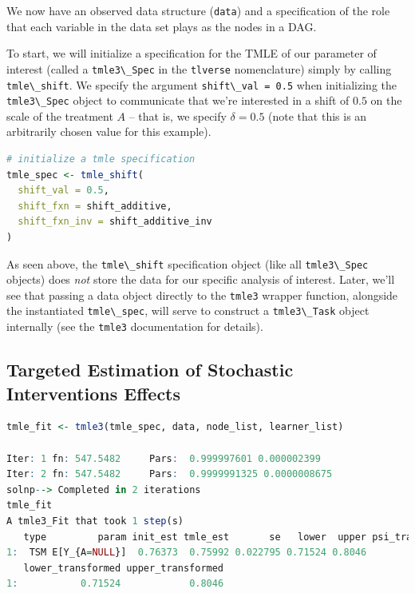 \documentclass[12pt, krantz2,]{krantz}
\newcommand{\passthrough}[1]{#1}
\theoremstyle{definition}
\theoremstyle{definition}
\theoremstyle{definition}
\newcommand{\1}{\mathbbm{1}}
\begin{document}
We now have an observed data structure (\passthrough{\lstinline!data!}) and a specification of the role
that each variable in the data set plays as the nodes in a DAG.

To start, we will initialize a specification for the TMLE of our parameter of
interest (called a \passthrough{\lstinline!tmle3\_Spec!} in the \passthrough{\lstinline!tlverse!} nomenclature) simply by calling
\passthrough{\lstinline!tmle\_shift!}. We specify the argument \passthrough{\lstinline!shift\_val = 0.5!} when initializing the
\passthrough{\lstinline!tmle3\_Spec!} object to communicate that we're interested in a shift of \(0.5\) on
the scale of the treatment \(A\) -- that is, we specify \(\delta = 0.5\) (note that
this is an arbitrarily chosen value for this example).

\begin{lstlisting}[language=R]
# initialize a tmle specification
tmle_spec <- tmle_shift(
  shift_val = 0.5,
  shift_fxn = shift_additive,
  shift_fxn_inv = shift_additive_inv
)
\end{lstlisting}

As seen above, the \passthrough{\lstinline!tmle\_shift!} specification object (like all \passthrough{\lstinline!tmle3\_Spec!}
objects) does \emph{not} store the data for our specific analysis of interest. Later,
we'll see that passing a data object directly to the \passthrough{\lstinline!tmle3!} wrapper function,
alongside the instantiated \passthrough{\lstinline!tmle\_spec!}, will serve to construct a \passthrough{\lstinline!tmle3\_Task!}
object internally (see the \passthrough{\lstinline!tmle3!} documentation for details).

\hypertarget{targeted-estimation-of-stochastic-interventions-effects}{%
\subsection{Targeted Estimation of Stochastic Interventions Effects}\label{targeted-estimation-of-stochastic-interventions-effects}}

\begin{lstlisting}[language=R]
tmle_fit <- tmle3(tmle_spec, data, node_list, learner_list)

Iter: 1 fn: 547.5482     Pars:  0.999997601 0.000002399
Iter: 2 fn: 547.5482     Pars:  0.9999991325 0.0000008675
solnp--> Completed in 2 iterations
tmle_fit
A tmle3_Fit that took 1 step(s)
   type         param init_est tmle_est       se   lower  upper psi_transformed
1:  TSM E[Y_{A=NULL}]  0.76373  0.75992 0.022795 0.71524 0.8046         0.75992
   lower_transformed upper_transformed
1:           0.71524            0.8046
\end{lstlisting}
\end{document}
